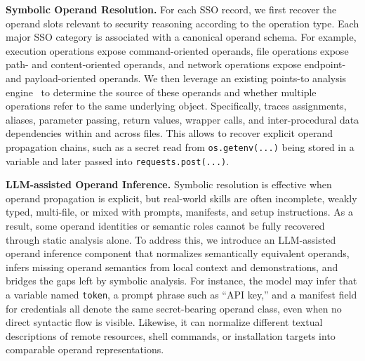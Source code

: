 \noindent \textbf{Symbolic Operand Resolution.} For each SSO record, we first recover the operand slots relevant to security reasoning according to the operation type. 
Each major SSO category is associated with a canonical operand schema. For example, execution operations expose command-oriented operands, file operations expose path- and content-oriented operands, and network operations expose endpoint- and payload-oriented operands. We then leverage an existing points-to analysis engine~\cite{yasa-engine,wang2026yasa} to determine the source of these operands and whether multiple operations refer to the same underlying object. Specifically, \toolname traces assignments, aliases, parameter passing, return values, wrapper calls, and inter-procedural data dependencies within and across files. This allows \toolname to recover explicit operand propagation chains, such as a secret read from \texttt{os.getenv(...)} being stored in a variable and later passed into \texttt{requests.post(...)}. 

\noindent \textbf{LLM-assisted Operand Inference.} Symbolic resolution is effective when operand propagation is explicit, but real-world skills are often incomplete, weakly typed, multi-file, or mixed with prompts, manifests, and setup instructions. As a result, some operand identities or semantic roles cannot be fully recovered through static analysis alone. To address this, we introduce an LLM-assisted operand inference component that normalizes semantically equivalent operands, infers missing operand semantics from local context and demonstrations, and bridges the gaps left by symbolic analysis. For instance, the model may infer that a variable named \texttt{token}, a prompt phrase such as ``API key,'' and a manifest field for credentials all denote the same secret-bearing operand class, even when no direct syntactic flow is visible. Likewise, it can normalize different textual descriptions of remote resources, shell commands, or installation targets into comparable operand representations. 


